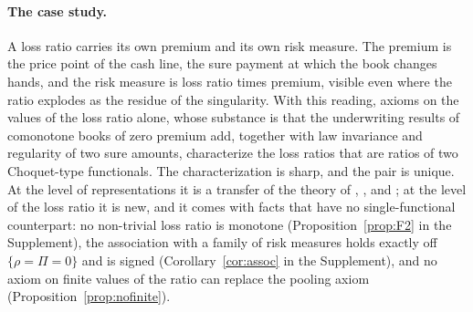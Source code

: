 \paragraph{The case study.}
A loss ratio carries its own premium and its own risk measure. The premium is the price point of the cash line,
the sure payment at which the book changes hands, and the risk measure is loss ratio times premium, visible even
where the ratio explodes as the residue of the singularity. With this reading, axioms on the values of the loss
ratio alone, whose substance is that the underwriting results of comonotone books of zero premium add, together with
law invariance and regularity of two sure amounts, characterize the loss ratios that are ratios of two Choquet-type
functionals. The characterization is sharp, and the pair is unique. At the level of representations it is a
transfer of the theory of \citet{yaari1987}, \citet{schmeidler1986}, \citet{wyp1997} and \citet{www2020}; at the
level of the loss ratio it is new, and it comes with facts that have no single-functional counterpart: no non-trivial
loss ratio is monotone (Proposition~\ref{prop:F2} in the Supplement), the association with a family of risk measures holds exactly
off $\{\rho=\Pi=0\}$ and is signed (Corollary~\ref{cor:assoc} in the Supplement), and no axiom on finite values of
the ratio can replace the pooling axiom (Proposition~\ref{prop:nofinite}).

